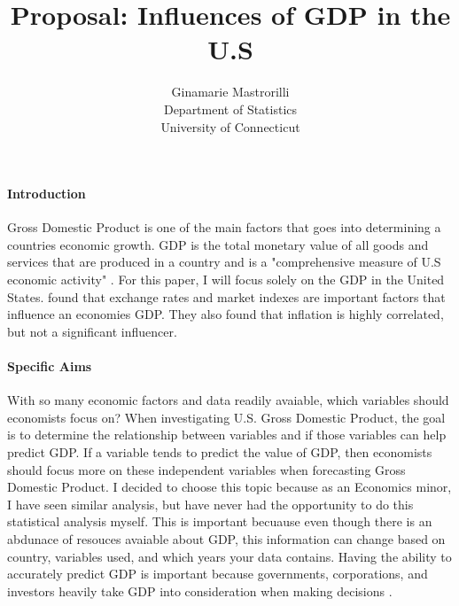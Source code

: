 \documentclass[12pt]{article}
\title{Proposal: Influences of GDP in the U.S }
\author{Ginamarie Mastrorilli\\
  Department of Statistics\\
  University of Connecticut
}
\begin{document}
\maketitle


\paragraph{Introduction}
Gross Domestic Product is one of the main factors that goes into determining a countries economic growth. 
GDP is the total monetary value of all goods and services that are produced in a country and is a "comprehensive measure of U.S economic activity" \citet[]{bea}.
For this paper, I will focus solely on the GDP in the United States. 
\citet{divya2014study} found that exchange rates and market indexes are important factors that influence an economies GDP. They also found that inflation is highly correlated, but not a significant influencer.  

\paragraph{Specific Aims}
With so many economic factors and data readily avaiable, which variables should economists focus on?
When investigating U.S. Gross Domestic Product, the goal is to determine the relationship between variables and if those variables can help predict GDP.
If a variable tends to predict the value of GDP, then economists should focus more on these independent variables when forecasting Gross Domestic Product.
I decided to choose this topic because as an Economics minor, I have seen similar analysis, but have never had the opportunity to do this statistical analysis myself. 
This is important becuause even though there is an abdunace of resouces avaiable about GDP, this information can change based on country, variables used, and which years your data contains. 
Having the ability to accurately predict GDP is important because governments, corporations, and investors heavily take GDP into consideration when making decisions \citet[]{cfi}.

\end{document}
